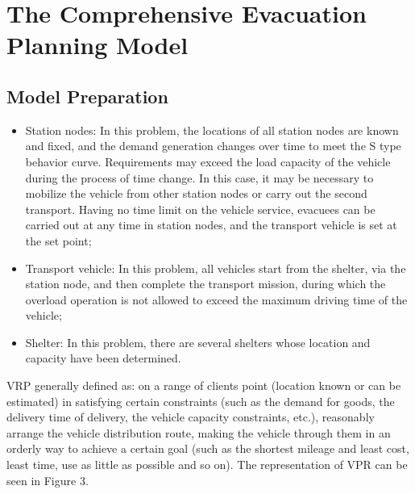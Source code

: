 \documentclass{mcmthesis}
\begin{document}


\section{The Comprehensive Evacuation Planning Model}
\subsection{Model Preparation}

\begin{itemize}

\item Station nodes: In this problem, the locations of all station nodes are known and fixed, and the demand generation changes over time to meet the S type behavior curve. Requirements may exceed the load capacity of the vehicle during the process of time change. In this case, it may be necessary to mobilize the vehicle from other station nodes or carry out the second transport. Having no time limit on the vehicle service, evacuees can be carried out at any time in station nodes, and the transport vehicle is set at the set point;
\item Transport vehicle: In this problem, all vehicles start from the shelter, via the station node, and then complete the transport mission, during which the overload operation is not allowed to exceed the maximum driving time of the vehicle;

\item Shelter: In this problem, there are several shelters whose location and capacity have been determined.
\end{itemize}

VRP \cite{Dikas2016Solving,He2015Model} generally defined as: on a range of clients point (location known or can be estimated) in satisfying certain constraints (such as the demand for goods, the delivery time of delivery, the vehicle capacity constraints, etc.), reasonably arrange the vehicle distribution route, making the vehicle through them in an orderly way to achieve a certain goal (such as the shortest mileage and least cost, least time, use as little as possible and so on). The representation of VPR can be seen in Figure 3.
\end{document}
